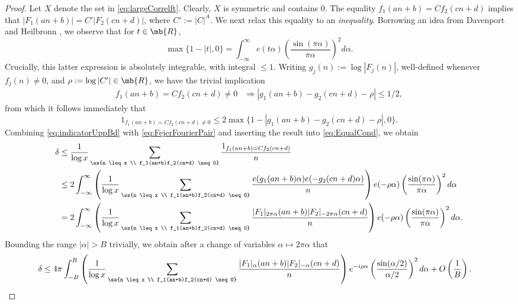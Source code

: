\begin{proof}
Let $X$ denote the set in \eqref{eq:largeCorrelft}. Clearly, $X$ is symmetric and contains 0. 
The equality $f_1(an+b) = Cf_2(cn+d)$ implies that $|F_1(an+b)| = C'|F_2(cn+d)|$, where $C' := |C|^A$. We next relax this equality to an \emph{inequality}. Borrowing an idea from Davenport and Heilbronn \cite{DavHeil}, we observe that for $t \in \mb{R}$,
\begin{equation}\label{eq:FejerFourierPair}
\max\{1-|t|,0\} = \int_{-\infty}^\infty e(t\alpha) \left(\frac{\sin(\pi \alpha)}{\pi \alpha}\right)^2 d\alpha.
\end{equation}
Crucially, this latter expression is absolutely integrable, with integral  $\leq 1$. Writing $g_j(n) := \log |F_j(n)|$, well-defined whenever $f_j(n) \neq 0$, and $\rho := \log |C'| \in \mb{R}$, we have the trivial implication
\begin{align*}
f_1(an+b) = Cf_2(cn+d) \neq 0 &\Rightarrow |g_1(an+b)-g_2(cn+d)-\rho| \leq 1/2,
\end{align*}
from which it follows immediately that
\begin{equation} \label{eq:indicatorUppBd}
1_{f_1(an+b) = Cf_2(cn+d) \neq 0} \leq 2\max\{1-|g_1(an+b)-g_2(cn+d) - \rho|, 0\}.
\end{equation}
Combining \eqref{eq:indicatorUppBd} with \eqref{eq:FejerFourierPair} and inserting the result  into \eqref{eq:EqualCond}, we obtain
\begin{align*}
\delta &\leq \frac{1}{\log x} \sum_{\ss{n \leq x \\ f_1(an+b)f_2(cn+d) \neq 0}} \frac{1_{f_1(an+b) = Cf_2(cn+d)}}{n} \\
&\leq 2 \int_{-\infty}^\infty \left(\frac{1}{\log x} \sum_{\ss{n \leq x \\ f_1(an+b)f_2(cn+d) \neq 0}} \frac{e(g_1(an+b)\alpha) e(-g_2(cn+d)\alpha)}{n}\right) e(-\rho\alpha) \left(\frac{\sin(\pi \alpha)}{\pi \alpha}\right)^2 d\alpha \\
&= 2 \int_{-\infty}^\infty \left(\frac{1}{\log x} \sum_{\ss{n \leq x \\ f_1(an+b)f_2(cn+d) \neq 0}} \frac{|F_1|_{2 \pi \alpha}(an+b)|F_2|_{-2 \pi \alpha}(cn+d)}{n}\right) e(-\rho\alpha)\left(\frac{\sin(\pi \alpha)}{\pi \alpha}\right)^2 d\alpha.
\end{align*}
%
Bounding the range $|\alpha| > B$ trivially, we obtain after a change of variables $\alpha \mapsto 2\pi \alpha$ that
\begin{align}
%
\delta &\leq 4\pi \int_{-B}^B \left(\frac{1}{\log x} \sum_{\ss{n \leq x \\ f_1(an+b)f_2(cn+d) \neq 0}} \frac{|F_1|_{\alpha}(an+b) |F_2|_{-\alpha}(cn+d)}{n}\right) e^{-i\rho\alpha} \left(\frac{\sin(\alpha/2)}{ \alpha/2}\right)^2 d\alpha + O\left(\frac{1}{B}\right). \label{eq:truncDH}

\end{align}
\end{proof}
